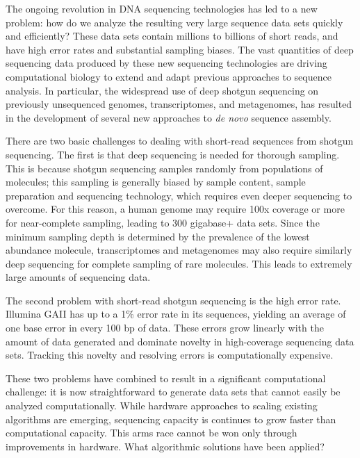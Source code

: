 \documentclass[10pt]{article}
\begin{document}
The ongoing revolution in DNA sequencing technologies has led to a new
problem: how do we analyze the resulting very large sequence data sets
quickly and efficiently? These data sets contain millions to billions
of short reads, and have high error rates and substantial sampling
biases.  The vast quantities of deep sequencing data produced by
these new sequencing technologies are driving
computational biology to extend and adapt previous approaches to sequence
analysis.  In
particular, the widespread use of deep shotgun sequencing on
previously unsequenced genomes, transcriptomes, and metagenomes, has
resulted in the development of several new approaches to {\em de novo}
sequence assembly.

There are two basic challenges to dealing with short-read sequences
from shotgun sequencing. The first is that deep sequencing is needed
for thorough sampling. This is because shotgun sequencing samples
randomly from populations of molecules; this sampling is
generally biased by sample content,
sample preparation and sequencing technology, which requires even deeper
sequencing to overcome.  For this reason, a
human genome may require 100x coverage or more for near-complete
sampling, leading to 300 gigabase+ data sets.  Since the minimum sampling depth
is determined by the prevalence of the lowest abundance molecule, transcriptomes and
metagenomes may also require similarly deep sequencing for complete
sampling of rare molecules. This leads to extremely large amounts of
sequencing data.

The second problem with short-read shotgun sequencing is the high
error rate.  Illumina GAII has up to a 1\% error rate in its
sequences, yielding an average of one base error in every 100 bp of
data.  These errors grow linearly with the amount of data generated and
dominate novelty in high-coverage sequencing data sets.  Tracking this
novelty and resolving errors is computationally expensive.

These two problems have combined to result in a significant
computational challenge: it is now straightforward to generate data
sets that cannot easily be analyzed computationally.  While hardware approaches
to scaling existing algorithms are emerging, sequencing capacity
is continues to grow faster than computational capacity.
This arms race cannot be won only through improvements
in hardware.  What algorithmic solutions have been applied?
\end{document}
